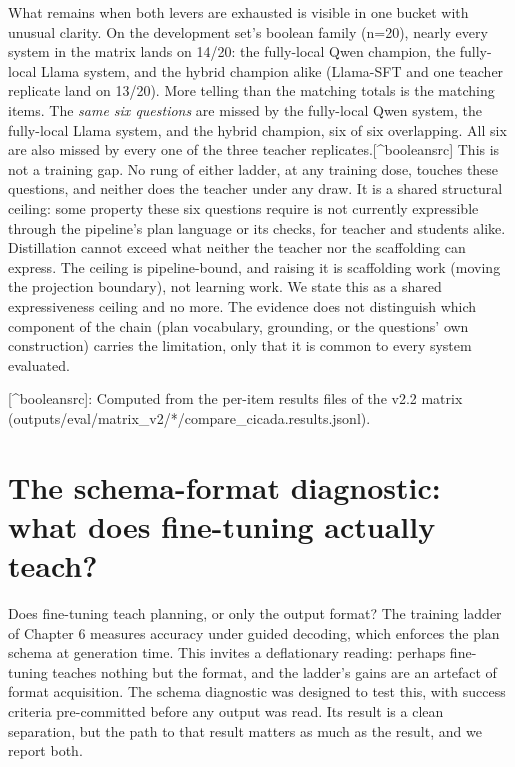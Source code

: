 \documentclass[10pt]{article} %
\begin{document}
What remains when both levers are exhausted is visible in one bucket with unusual clarity. On the development set's boolean family (n=20), nearly every system in the matrix lands on 14/20: the fully-local Qwen champion, the fully-local Llama system, and the hybrid champion alike (Llama-SFT and one teacher replicate land on 13/20). More telling than the matching totals is the matching items. The \emph{same six questions} are missed by the fully-local Qwen system, the fully-local Llama system, and the hybrid champion, six of six overlapping. All six are also missed by every one of the three teacher replicates.[\^{}booleansrc] This is not a training gap. No rung of either ladder, at any training dose, touches these questions, and neither does the teacher under any draw. It is a shared structural ceiling: some property these six questions require is not currently expressible through the pipeline's plan language or its checks, for teacher and students alike. Distillation cannot exceed what neither the teacher nor the scaffolding can express. The ceiling is pipeline-bound, and raising it is scaffolding work (moving the projection boundary), not learning work. We state this as a shared expressiveness ceiling and no more. The evidence does not distinguish which component of the chain (plan vocabulary, grounding, or the questions' own construction) carries the limitation, only that it is common to every system evaluated.

[\^{}booleansrc]: Computed from the per-item results files of the v2.2 matrix (outputs/eval/matrix\_v2/*/compare\_cicada.results.jsonl).

\section{The schema-format diagnostic: what does fine-tuning actually teach?}\label{sec:the-schema-format-diagnostic-what-does-f}

Does fine-tuning teach planning, or only the output format? The training ladder of Chapter 6 measures accuracy under guided decoding, which enforces the plan schema at generation time. This invites a deflationary reading: perhaps fine-tuning teaches nothing but the format, and the ladder's gains are an artefact of format acquisition. The schema diagnostic was designed to test this, with success criteria pre-committed before any output was read. Its result is a clean separation, but the path to that result matters as much as the result, and we report both.
\end{document}
